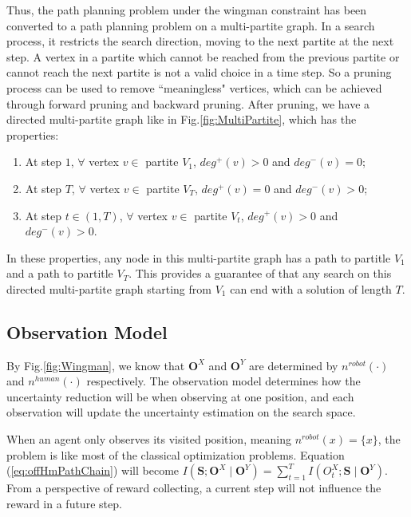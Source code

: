\documentclass[12pt]{article}
\begin{document}
Thus, the path planning problem under the wingman constraint has been converted to a path planning problem on a multi-partite graph. In a search process, it restricts the search direction, moving to the next partite at the next step. A vertex in a partite which cannot be reached from the previous partite or cannot reach the next partite is not a valid choice in a time step. So a pruning process can be used to remove ``meaningless" vertices, which can be achieved through forward pruning and backward pruning. After pruning, we have a directed multi-partite graph like in Fig.\ref{fig:MultiPartite}, which has the properties:
\begin{enumerate}
\item At step $ 1 $, $ \forall $ vertex $ v \in $ partite $ V_{1} $, $ deg^{+}(v) > 0 $ and $ deg^{-}(v) = 0 $;
\item At step $ T $, $ \forall $ vertex $ v \in $ partite $ V_{T} $, $ deg^{+}(v) = 0 $ and $ deg^{-}(v) > 0 $;
\item At step $ t \in (1, T) $, $ \forall $ vertex $ v \in $ partite $ V_{t} $, $ deg^{+}(v) > 0 $ and $ deg^{-}(v) > 0 $.
\end{enumerate}

In these properties, any node in this multi-partite graph has a path to partitle $ V_{1} $ and a path to partitle $ V_{T} $. This provides a guarantee of that any search on this directed multi-partite graph starting from $ V_{1} $ can end with a solution of length $ T $.

\subsection{Observation Model}

By Fig.\ref{fig:Wingman}, we know that $ \textbf{O}^{X} $ and $ \textbf{O}^{Y} $ are determined by  $ n^{robot}(\cdot) $ and  $ n^{human}(\cdot) $ respectively. The observation model determines how the uncertainty reduction will be when observing at one position, and each observation will update the uncertainty estimation on the search space. 

When an agent only observes its visited position, meaning $ n^{robot}(x) = \{ x \} $, the problem is like most of the classical optimization problems. Equation (\ref{eq:offHmPathChain}) will become $ I(\textbf{S}; \textbf{O}^{X} \mid \textbf{O}^{Y}) = \sum_{t=1}^{T} I(O^{X}_{t} ; \textbf{S} \mid \textbf{O}^{Y}) $. From a perspective of reward collecting, a current step will not influence the reward in a future step.
\end{document}
